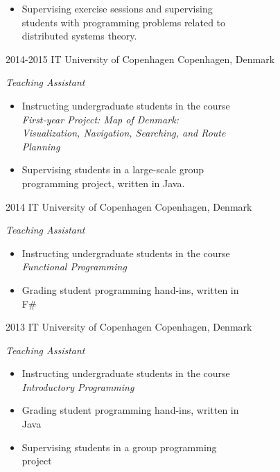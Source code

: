 \documentclass[]{friggeri-cv} %
\begin{document}
\begin{entrylist}
{\begin{itemize}
	\item Supervising exercise sessions and supervising\\students with programming problems related to\\distributed systems theory.
\end{itemize}}
\entry
{2014-2015}
{IT University of Copenhagen}
{Copenhagen, Denmark}
{\emph{Teaching Assistant}
\begin{itemize}
	\item Instructing undergraduate students in the course \\\emph{First-year Project: Map of Denmark:\\Visualization, Navigation, Searching, and Route\\Planning}
	\item Supervising students in a large-scale group\\programming project, written in Java.
\end{itemize}}
\end{entrylist}
\begin{entrylist} 
\entry
{2014}
{IT University of Copenhagen}
{Copenhagen, Denmark}
{\emph{Teaching Assistant}
\begin{itemize}
	\item Instructing undergraduate students in the course \\\emph{Functional Programming}
	\item Grading student programming hand-ins, written in\\F\#
\end{itemize}}
\entry
{2013}
{IT University of Copenhagen}
{Copenhagen, Denmark}
{\emph{Teaching Assistant}
\begin{itemize}
	\item Instructing undergraduate students in the course \\\emph{Introductory Programming}
	\item Grading student programming hand-ins, written in\\Java
	\item Supervising students in a group programming\\project
\end{itemize}}
\end{entrylist}
\end{document}
